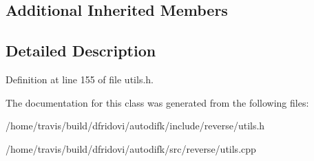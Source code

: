 \subsection*{Additional Inherited Members}


\subsection{Detailed Description}


Definition at line 155 of file utils.\-h.



The documentation for this class was generated from the following files\-:\begin{DoxyCompactItemize}
\item 
/home/travis/build/dfridovi/autodifk/include/reverse/utils.\-h\item 
/home/travis/build/dfridovi/autodifk/src/reverse/utils.\-cpp\end{DoxyCompactItemize}
